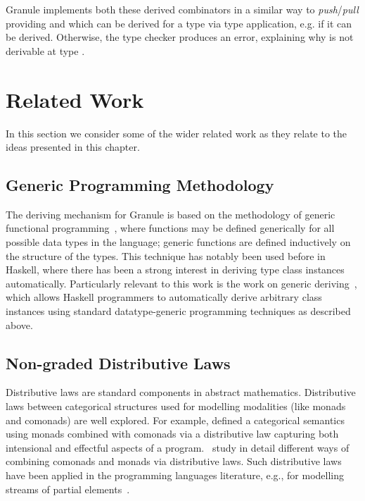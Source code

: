 Granule implements both these derived combinators in a similar
way to \emph{push}/\emph{pull} providing 
and  which can be derived for a type  via type
application, e.g.  if it can be derived.
Otherwise, the type checker produces an error,
explaining why  is not derivable at type .

\section{Related Work}
\label{sec:deriving-related}
In this section we consider some of the wider related work as they relate to the
ideas presented in this chapter.
\subsection{Generic Programming Methodology}
The deriving mechanism for Granule is based on the methodology of generic
functional programming~\citep{hinze2000new}, where functions may be defined
generically for all possible data types in the language; generic functions are
defined inductively on the structure of the types. This technique has notably
been used before in Haskell, where there has been a strong interest in deriving
type class instances automatically. Particularly relevant to this work is the
work on generic deriving~\citep{generic-deriving}, which allows Haskell
programmers to automatically derive arbitrary class instances using standard
datatype-generic programming techniques as described above. 

\subsection{Non-graded Distributive Laws}
Distributive laws are standard components in abstract
mathematics. Distributive laws between categorical structures used for
modelling modalities (like monads and comonads) are well explored. For
example, \citet{brookes1993intensional} defined a categorical semantics using monads
combined with comonads via a distributive law capturing both
intensional and effectful aspects of a
program.~\citet{power2002combining} study in
detail different ways of combining comonads and monads via
distributive laws. Such distributive laws
have been applied in the programming languages literature, e.g., for
modelling streams of partial elements~\citep{uustalu2006essence}.

